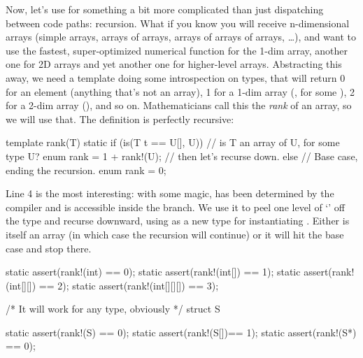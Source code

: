Now, let's use  for something a bit more complicated than just dispatching between code paths: recursion.  What if you know you will receive n-dimensional arrays (simple arrays, arrays of arrays, arrays of arrays of arrays, \ldots), and want to use the fastest, super-optimized numerical function for the 1-dim array, another one for 2D arrays and yet another one for higher-level arrays. Abstracting this away, we need a template doing some introspection on types, that will return 0 for an element (anything that's not an array), 1 for a 1-dim array (, for some ), 2 for a 2-dim array (), and so on. Mathematicians call this the \emph{rank} of an array, so we will use that. The definition is perfectly recursive: 
\begin{dcode}
template rank(T)
{
    static if (is(T t == U[], U)) // is T an array of U, for some type U?
        enum rank = 1 + rank!(U); // then let's recurse down.
    else                          // Base case, ending the recursion.
        enum rank = 0; 
}
\end{dcode}

Line 4 is the most interesting: with some  magic,  has been determined by the compiler and is accessible inside the  branch. We use it to peel one level of `\DD{[]}' off the type and recurse downward, using  as a new type for instantiating . Either  is itself an array (in which case the recursion will continue) or it will hit the base case and stop there.

\begin{dcode}
static assert(rank!(int)       == 0);
static assert(rank!(int[])     == 1);
static assert(rank!(int[][])   == 2);
static assert(rank!(int[][][]) == 3);

/* It will work for any type, obviously */
struct S {}

static assert(rank!(S)  == 0);
static assert(rank!(S[])== 1);
static assert(rank!(S*) == 0);
\end{dcode}


